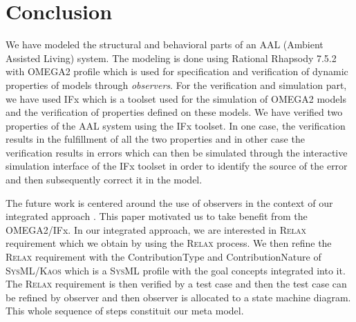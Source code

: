 \documentclass[a4paper,twoside]{article}
\def\myrelax{\textsc{Relax}}                  %
\def\sysml{\textsc{SysML}}
\def\kaos{\textsc{Kaos}}
\begin{document}
\section{{Conclusion}\label{conclusion}}
We have modeled the structural and behavioral parts of an AAL (Ambient Assisted Living) system. The modeling is done using Rational Rhapsody 7.5.2  with OMEGA2 profile which is used for specification and verification of dynamic properties of models through \textit{observers}. For the verification and simulation part, we have used IFx which is a toolset used for the simulation of OMEGA2 models and the verification of properties defined on these models. We have verified two properties of the AAL system using the IFx toolset. In one case, the verification results in the fulfillment of all the two properties and in other case the verification results in errors which can then be simulated through the interactive simulation interface of the IFx toolset in order to identify the source of the error and then subsequently correct it in the model. 

The future work is centered around the use of observers in the context of our integrated approach \cite{test9}. This paper motivated us to take benefit from the OMEGA2/IFx. In our integrated approach, we are interested in \myrelax{} requirement which we obtain by using the \myrelax{} process. We then refine the \myrelax{} requirement with the ContributionType and ContributionNature of \sysml{}/\kaos{} \cite{test10} which is a \sysml{} profile with the goal concepts integrated into it. The \myrelax{} requirement is then verified by a test case and then the test case can be refined by observer and then observer is allocated to a state machine diagram. This whole sequence of steps constituit our meta model.
\end{document}
